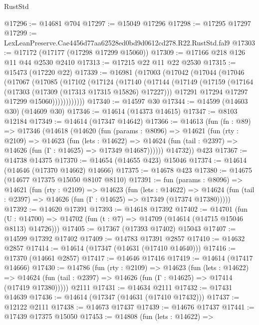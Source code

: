 \begin{lexlean}{RustStd}
\begin{coremodule}
@17296 := @14681 @704
@17297 := @15049 @17296
@17298 := @17295 @17297
@17299 := LexLeanPreserve.Cae4456d77aa62528ed0bd9d0612cd278.R22.RustStd.fal9
@17303 := @17172 (@17177 (@17298 @17299 @15060))
@17309 := @17166 @218 @126 @11 @44 @2530 @2410
@17313 := @17215 @22 @11 @22 @2530
@17315 := @15473 (@17220 @22)
@17339 := @16981
    (@17003
      (@17042
        (@17044
          (@17046
            (@17067
              (@17085
                (@17102
                  (@17124
                    (@17140
                      (@17144
                        (@17149
                          (@17159
                            (@17164 (@17303 (@17309 (@17313 @17315 @15826) @17227)))
                            @17291
                            @17294
                            @17297
                            @17299
                            @15060))))))))))))
@17340 := @14597 @30
@17344 := @14599 (@14603 @30) (@14609 @30)
@17346 := @14614 (@14373 @14615)
@17347 := @8103 @12184
@17349 := @14614 (@17347 @14642)
@17366 := @14613
    (fun (fn : @89) =>
    @17346
      (@14618
        (@14620
          (fun (params : @8096) =>
          @14621
            (fun (rty : @2109) =>
            @14623
              (fun (lets : @14622) =>
              @14624 (fun (tail : @2397) => @14626 (fun (Γ : @14625) => @17349 @14687))))))
        @14732))
    @423
@17367 := @14738 @14375
@17370 := @14654 (@14655 @423) @15046
@17374 := @14614 (@14646 (@17370 @14662) @14666)
@17375 := @14678 @423
@17380 := @14675 (@14677 @17375 @15050 @8107 @8110)
@17391 := fun (params : @8096) =>
  @14621
    (fun (rty : @2109) =>
    @14623
      (fun (lets : @14622) =>
      @14624 (fun (tail : @2397) => @14626 (fun (Γ : @14625) => @17349 (@17374 @17380)))))
@17392 := @14620 @17391
@17393 := @14618 @17392
@17402 := @14701
    (fun (U : @14700) => @14702 (fun (t : @7) => @14709 (@14614 (@14715 @15046 @8113) @14726)))
@17405 := @17367 (@17393 @17402) @15043
@17407 := @14599 @17392 @17402
@17409 := @14783 @17391 @2857
@17410 := @14632 @2857
@17414 := @14614 (@17347 (@14631 (@17410 @14640)))
@17416 := @17370 (@14661 @2857)
@17417 := @14646 @17416
@17419 := @14614 (@17417 @14666)
@17430 := @14786
    (fun (rty : @2109) =>
    @14623
      (fun (lets : @14622) =>
      @14624 (fun (tail : @2397) => @14626 (fun (Γ : @14625) => @17414 (@17419 @17380)))))
    @2111
@17431 := @14634 @2111
@17432 := @17431 @14639
@17436 := @14614 (@17347 (@14631 (@17410 @17432)))
@17437 := @12122 @2111
@17438 := @14673 @17437
@17439 := @14676 @17437
@17441 := @17439 @17375 @15050
@17453 := @14808
    (fun (lets : @14622) =>

\end{coremodule}
\end{lexlean}
